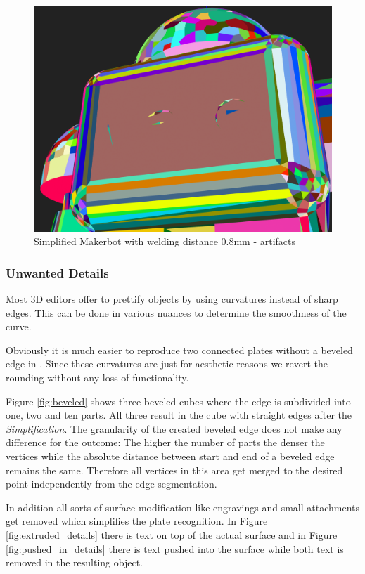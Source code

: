 \documentclass[../ClassicThesis.tex]{subfiles}
\begin{document}
\begin{figure}
\includegraphics[width=0.8\columnwidth]{Images/04-approx-welding-make-0_8mm.png}
\caption{Simplified Makerbot with welding distance 0.8mm - artifacts}
\label{fig:08mmMakerbotMake}
\end{figure}

\subsubsection{Unwanted Details}

Most 3D editors offer to prettify objects by using curvatures instead of sharp edges. This can be done in various nuances to determine the smoothness of the curve.

Obviously it is much easier to reproduce two connected plates without a beveled edge in . Since these curvatures are just for aesthetic reasons we revert the rounding without any loss of functionality.

Figure \ref{fig:beveled} shows three beveled cubes where the edge is subdivided into one, two and ten parts. All three result in the cube with straight edges after the \emph{Simplification}. The granularity of the created beveled edge does not make any difference for the outcome:
The higher the number of parts the denser the vertices while the absolute distance between start and end of a beveled edge remains the same. Therefore all vertices in this area get merged to the desired point independently from the edge segmentation.

In addition all sorts of surface modification like engravings and small attachments get removed which simplifies the plate recognition. In Figure \ref{fig:extruded_details} there is text on top of the actual surface and in Figure \ref{fig:pushed_in_details} there is text pushed into the surface while both text is removed in the resulting object.
\end{document}
